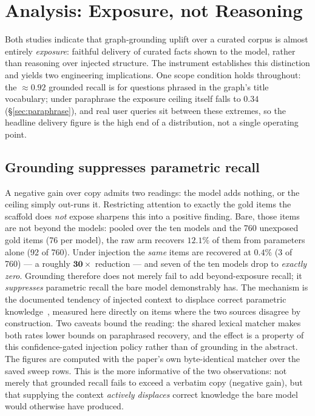 \documentclass[10pt,twocolumn]{article}
\begin{document}
\section{Analysis: Exposure, not Reasoning}\label{sec:analysis}
Both studies indicate that graph-grounding uplift over a curated corpus is almost entirely \emph{exposure}: faithful delivery of curated facts shown to the model, rather than reasoning over injected structure. The instrument establishes this distinction and yields two engineering implications. One scope condition holds throughout: the $\approx0.92$ grounded recall is for questions phrased in the graph's title vocabulary; under paraphrase the exposure ceiling itself falls to $0.34$ (\S\ref{sec:paraphrase}), and real user queries sit between these extremes, so the headline delivery figure is the high end of a distribution, not a single operating point.

\subsection{Grounding suppresses parametric recall}\label{sec:suppression}
A negative gain over copy admits two readings: the model adds nothing, or the ceiling simply out-runs it. Restricting attention to exactly the gold items the scaffold does \emph{not} expose sharpens this into a positive finding. Bare, those items are not beyond the models: pooled over the ten models and the 760 unexposed gold items (76 per model), the raw arm recovers $\mathbf{12.1\%}$ of them from parameters alone (92 of 760). Under injection the \emph{same} items are recovered at $\mathbf{0.4\%}$ (3 of 760) --- a roughly $\mathbf{30\times}$ reduction --- and seven of the ten models drop to \emph{exactly zero}. Grounding therefore does not merely fail to add beyond-exposure recall; it \emph{suppresses} parametric recall the bare model demonstrably has. The mechanism is the documented tendency of injected context to displace correct parametric knowledge~\cite{shi2023distracted,yoran2024robust,longpre2021entity}, measured here directly on items where the two sources disagree by construction. Two caveats bound the reading: the shared lexical matcher makes both rates lower bounds on paraphrased recovery, and the effect is a property of this confidence-gated injection policy rather than of grounding in the abstract. The figures are computed with the paper's own byte-identical matcher over the saved sweep rows. This is the more informative of the two observations: not merely that grounded recall fails to exceed a verbatim copy (negative gain), but that supplying the context \emph{actively displaces} correct knowledge the bare model would otherwise have produced.
\end{document}
